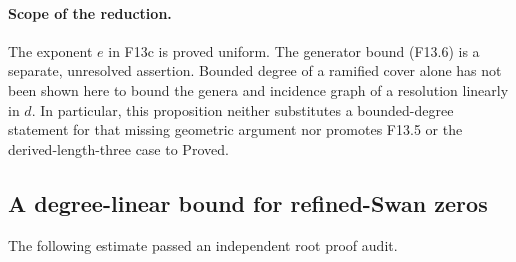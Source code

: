 \paragraph{Scope of the reduction.}
The exponent $e$ in F13c is proved uniform. The generator bound
(F13.6) is a separate, unresolved assertion. Bounded degree of a
ramified cover alone has not been shown here to bound the genera
and incidence graph of a resolution linearly in $d$. In particular,
this proposition neither substitutes a bounded-degree statement
for that missing geometric argument nor promotes F13.5 or the
derived-length-three case to Proved.


\subsection{A degree-linear bound for refined-Swan zeros}

The following estimate passed an independent root proof audit.

